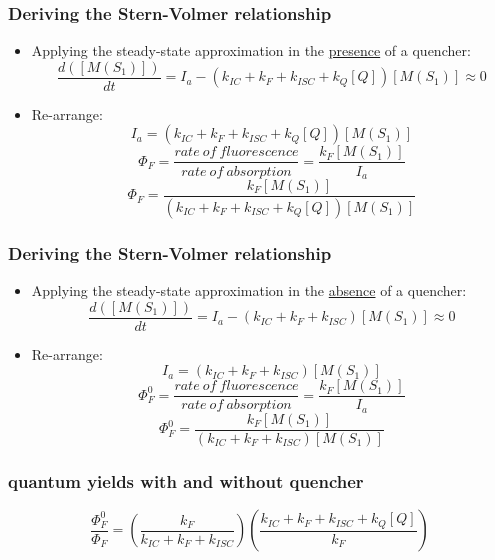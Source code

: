 \documentclass[ignorenonframetext]{beamer}
\begin{document}
\begin{frame}
\frametitle{Deriving the Stern-Volmer relationship}
\begin{itemize}
\item<1-> Applying the steady-state approximation in the \underline{presence} of a quencher: \newline
\[ \frac{d([M(S_1)])}{dt} = I_a - (k_{IC} + k_F + k_{ISC} + k_Q[Q]) [M(S_1)] \approx 0\]
\item<2-> Re-arrange:\[ I_a = (k_{IC} + k_F + k_{ISC} + k_Q[Q])[M(S_1)] \]
\[\Phi_F = \frac{rate\ of\ fluorescence}{rate\ of\ absorption} = \frac{k_F[M(S_1)]}{I_a}\]
\[\Phi_F = \frac{k_F[M(S_1)]}{(k_{IC} + k_F + k_{ISC} + k_Q[Q])[M(S_1)]}\]
\begin{center}\end{center}
\end{itemize}
\end{frame}

\begin{frame}
\frametitle{Deriving the Stern-Volmer relationship}
\begin{itemize}
\item<1-> Applying the steady-state approximation in the \underline{absence} of a quencher: \newline
\[ \frac{d([M(S_1)])}{dt} = I_a - (k_{IC} + k_F + k_{ISC}) [M(S_1)] \approx 0\]
\item<2-> Re-arrange:\[ I_a = (k_{IC} + k_F + k_{ISC})[M(S_1)] \]
\[\Phi_F^0 = \frac{rate\ of\ fluorescence}{rate\ of\ absorption} = \frac{k_F[M(S_1)]}{I_a}\]
\[\Phi_F^0 = \frac{k_F[M(S_1)]}{(k_{IC} + k_F + k_{ISC})[M(S_1)]}\]
\begin{center} \end{center}
\end{itemize}
\end{frame}

\begin{frame}
\frametitle{quantum yields with and without quencher}
\[\frac{\Phi_F^0}{\Phi_F} = \left(\frac{k_F}{k_{IC} + k_F + k_{ISC}}\right)\left(\frac{k_{IC} + k_F + k_{ISC} + k_Q[Q]}{k_F}\right)\]



\end{frame}
\end{document}
